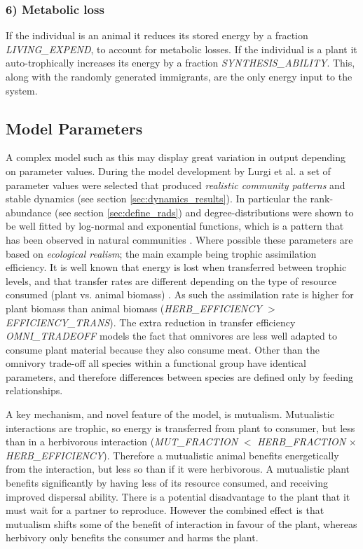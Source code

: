 \subsubsection*{6) Metabolic loss}
If the individual is an animal it reduces its stored energy by a fraction \emph{LIVING\_EXPEND}, to account for metabolic losses. If the individual is a plant it auto-trophically increases its energy by a fraction \emph{SYNTHESIS\_ABILITY}. This, along with the randomly generated immigrants, are the only energy input to the system.


\subsection{Model Parameters}
\label{sec:parameters}

A complex model such as this may display great variation in output depending on parameter values. During the model development by Lurgi et al. \cite{lurgi2015effects} a set of parameter values were selected that produced \emph{realistic community patterns} and stable dynamics (see section \ref{sec:dynamics_results}). In particular the rank-abundance (see section \ref{sec:define_rads}) and degree-distributions were shown to be well fitted by log-normal and exponential functions, which is a pattern that has been observed in natural communities \cite{montoya2006ecological}. Where possible these parameters are based on \emph{ecological realism}; the main example being trophic assimilation efficiency. It is well known that energy is lost when transferred between trophic levels, and that transfer rates are different depending on the type of resource consumed (plant vs. animal biomass) \cite{ings2009review}. As such the assimilation rate is higher for plant biomass than animal biomass (\emph{HERB\_EFFICIENCY} $>$ \emph{EFFICIENCY\_TRANS}). The extra reduction in transfer efficiency \emph{OMNI\_TRADEOFF} models the fact that omnivores are less well adapted to consume plant material because they also consume meat. Other than the omnivory trade-off all species within a functional group have identical parameters, and therefore differences between species are defined only by feeding relationships.

A key mechanism, and novel feature of the model, is mutualism. Mutualistic interactions are trophic, so energy is transferred from plant to consumer, but less than in a herbivorous interaction (\emph{MUT\_FRACTION} $<$ \emph{HERB\_FRACTION} $\times$ \emph{HERB\_EFFICIENCY}). Therefore a mutualistic animal benefits energetically from the interaction, but less so than if it were herbivorous. A mutualistic plant benefits significantly by having less of its resource consumed, and receiving improved dispersal ability. There is a potential disadvantage to the plant that it must wait for a partner to reproduce. However the combined effect is that mutualism shifts some of the benefit of interaction in favour of the plant, whereas herbivory only benefits the consumer and harms the plant.  

